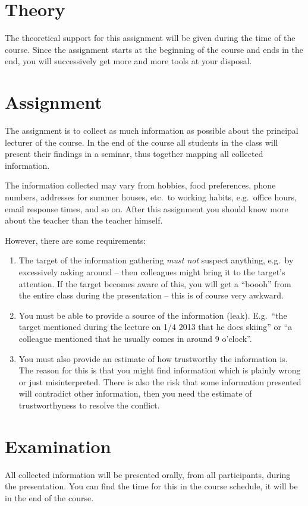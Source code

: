 \section{Theory}%
\label{sec:theory}
The theoretical support for this assignment will be given during the time of 
the course.
Since the assignment starts at the beginning of the course and ends in the end, 
you will successively get more and more tools at your disposal.


\section{Assignment}%
\label{sec:assignment}
The assignment is to collect as much information as possible about the 
principal lecturer of the course.
In the end of the course all students in the class will present their findings 
in a seminar, thus together mapping all collected information.

The information collected may vary from hobbies, food preferences, phone 
numbers, addresses for summer houses, etc.\ to working habits, e.g.\ office 
hours, email response times, and so on.
After this assignment you should know more about the teacher than the teacher 
himself.

However, there are some requirements:
\begin{enumerate}
  \item The target of the information gathering \emph{must not} suspect 
    anything, e.g.\ by excessively asking around -- then colleagues might bring 
    it to the target's attention.
    If the target becomes aware of this, you will get a ``boooh'' from the 
    entire class during the presentation -- this is of course very awkward.

  \item You must be able to provide a source of the information (leak).
    E.g.\ ``the target mentioned during the lecture on 1/4 2013 that he does 
    skiing'' or ``a colleague mentioned that he usually comes in around 
    9 o'clock''.

  \item You must also provide an estimate of how trustworthy the information 
    is.
    The reason for this is that you might find information which is plainly 
    wrong or just misinterpreted.
    There is also the risk that some information presented will contradict 
    other information, then you need the estimate of trustworthyness to resolve 
    the conflict.
\end{enumerate}


\section{Examination}%
\label{sec:exam}
All collected information will be presented orally, from all participants, 
during the presentation.
You can find the time for this in the course schedule, it will be in the end of 
the course.


\printbibliography{}
